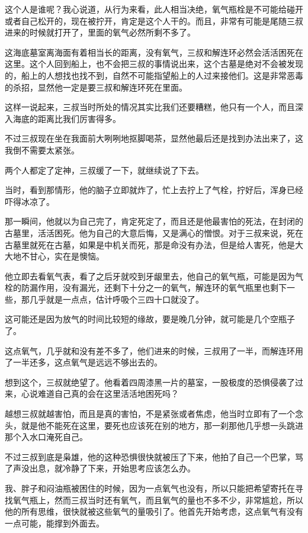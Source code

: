 这个人是谁呢？我心说道，从行为来看，此人相当决绝，氧气瓶栓是不可能给碰开或者自己松开的，现在被拧开，肯定是这个人干的。而且，非常有可能是尾随三叔进来的时候就打开了，里面的氧气必然所剩不多了。

这海底墓室离海面有着相当长的距离，没有氧气，三叔和解连环必然会活活困死在这里。这个人回到船上，也不会把三叔的事情说出来，这个古墓是绝对不会被发现的，船上的人想找也找不到，自然不可能指望船上的人过来接他们。这是非常恶毒的杀招，显然他一定是要三叔和解连环死在里面。

这样一说起来，三叔当时所处的情况其实比我们还要糟糕，他只有一个人，而且深入海底的距离比我们厉害得多。

不过三叔现在坐在我面前大咧咧地抠脚喝茶，显然他最后还是找到办法出来了，这我倒不需要太紧张。

两个人都定了定神，三叔缓了一下，就继续说了下去。

当时，看到那情形，他的脑子立即就炸了，忙上去拧上了气栓，拧好后，浑身已经吓得冰凉了。

那一瞬间，他就以为自己完了，肯定死定了，而且还是他最害怕的死法，在封闭的古墓里，活活困死。他为自己的大意后悔，又是满心的憎恨。对于三叔来说，死在古墓里就死在古墓，如果是中机关而死，那是命没有办法，但是给人害死，他是大大地不甘心，实在是懊恼。

他立即去看氧气表，看了之后牙就咬到牙龈里去，他自己的氧气瓶，可能是因为气栓的防漏作用，没有漏光，还剩下十分之一的氧气，解连环的氧气瓶里也剩下一些，那几乎就是一点点，估计呼吸个三四十口就没了。

这可能还是因为放气的时间比较短的缘故，要是晚几分钟，就可能是几个空瓶子了。

这点氧气，几乎就和没有差不多了，他们进来的时候，三叔用了一半，而解连环用了一半还多，这点氧气是远远不够出去的。

想到这个，三叔就绝望了。他看着四周漆黑一片的墓室，一股极度的恐惧侵袭了过来，心说难道自己真的会在这里活活地困死吗？

越想三叔就越害怕，而且是真的害怕，不是紧张或者焦虑，他当时立即有了一个念头，就是他不能死在这里，要死也应该死在别的地方，那一刹那他几乎想一头跳进那个入水口淹死自己。

不过三叔到底是枭雄，他的这种恐惧很快就被压了下来，他拍了自己一个巴掌，骂了声没出息，就冷静了下来，开始思考应该怎么办。

我、胖子和闷油瓶被困住的时候，因为一点氧气也没有，所以只能把希望寄托在寻找氧气瓶上，然而三叔当时还有氧气，而且氧气的量也不多不少，非常尴尬，所以他的所有思维，很快就被这些氧气的量吸引了。他首先开始考虑，这点氧气有没有一点可能，能撑到外面去。

